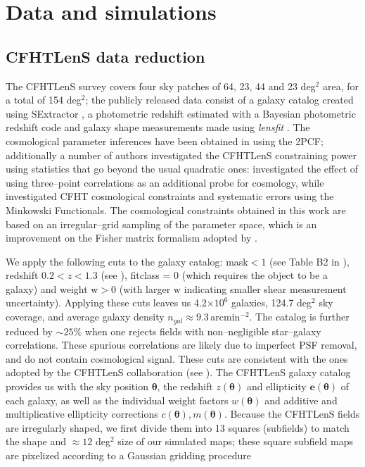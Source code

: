 \documentclass[reprint,aps,prd,superscriptaddress,showkeys,showpacs]{revtex4-1}
\begin{document}


\section{Data and simulations}

\subsection{CFHTLenS data reduction}
\label{cfhtdatareduction}
%
The CFHTLenS survey covers four sky patches of 64, 23, 44 and 23 deg$^2$ area, for a total of 154 deg$^2$; the publicly released data consist of a galaxy catalog created using SExtractor \citep{SExtractor}, a photometric redshift estimated with a Bayesian photometric redshift code \citep{PhotoCode} and galaxy shape measurements made using \textit{lensfit} \citep{cfht1,cfht2}. The cosmological parameter inferences have been obtained in \citep{CFHTKilbinger} using the 2PCF; additionally a number of authors investigated the CFHTLenS constraining power using statistics that go beyond the usual quadratic ones: \citep{CFHTFu} investigated the effect of using three--point correlations as an additional probe for cosmology, while \citep{CFHTMasato} investigated CFHT cosmological constraints and systematic errors using the Minkowski Functionals. The cosmological constraints obtained in this work are based on an irregular--grid sampling of the parameter space, which is an improvement on the Fisher matrix formalism adopted by \citep{CFHTMasato}. 

We apply the following cuts to the galaxy catalog: mask$<1$ (see Table B2 in \citep{SExtractor}), redshift $0.2 < z < 1.3$ (see \citep{cfht1}), fitclass = 0 (which requires the object to be a galaxy) and weight $\mathrm{w}>0$ (with larger $\mathrm{w}$ indicating smaller shear measurement uncertainty). Applying these cuts leaves us 4.2$\times10^6$ galaxies, 124.7 deg$^2$ sky coverage, and average galaxy density $n_{gal} \approx 9.3\,\mathrm{arcmin}^{-2}$. The catalog is further reduced by $\sim25\%$ when one rejects fields with non--negligible star--galaxy correlations. These spurious correlations are likely due to imperfect PSF removal, and do not contain cosmological signal. These cuts are consistent with the ones adopted by the CFHTLenS collaboration (see \citep{CFHTFu}). The CFHTLenS galaxy catalog provides us with the sky position $\pmb{\theta}$, the redshift $z(\pmb{\theta})$ and ellipticity $\mathbf{e}(\pmb{\theta})$ of each galaxy, as well as the individual weight factors $w(\pmb{\theta})$ and additive and multiplicative ellipticity corrections $c(\pmb{\theta}), m(\pmb{\theta})$. Because the CFHTLenS fields are irregularly shaped, we first divide them into 13 squares (subfields) to match the shape and $\approx12$ deg$^2$ size of our simulated maps; these square subfield maps are pixelized according to a Gaussian gridding procedure
\end{document}
